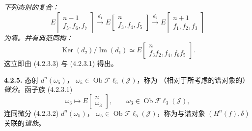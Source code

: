 \clearpage
{}%
\begingroup\small\setlength{\parskip}{0pt}\setlength{\emergencystretch}{2.5em}
\noindent\textit{下列态射的复合：}
\[
E\!\begin{bmatrix}n-1\\ f_5,f_6,f_7\end{bmatrix}
\xrightarrow{d_1}
E\!\begin{bmatrix}n\\ f_3,f_4,f_5\end{bmatrix}
\xrightarrow{d_2}
E\!\begin{bmatrix}n+1\\ f_1,f_2,f_3\end{bmatrix}
\]
\textit{为零。并有典范同构：}
\[
\operatorname{Ker}(d_2)\big/\operatorname{Im}(d_1)
\simeq
E\!\begin{bmatrix}n\\ f_3f_2,f_4,f_6f_5\end{bmatrix}.
\tag{4.2.4.1}
\]
这立即由 (4.2.3.3) 与 (4.2.3.1) 得出。

\medskip\noindent\textbf{4.2.5.}
态射 $d^n(\omega_5)$，
$\omega_5\in\operatorname{Ob}\mathcal{F}\ell_5(\mathcal J)$，称为
（相对于所考虑的谱对象的）\textit{微分}。函子族 (4.2.3.1)
\[
\omega_3\longmapsto
E\!\begin{bmatrix}n\\ \omega_3\end{bmatrix},
\qquad
\omega_3\in\operatorname{Ob}\mathcal{F}\ell_3(\mathcal J),
\]
连同微分 (4.2.3.2) $d^n(\omega_5)$，
$\omega_5\in\operatorname{Ob}\mathcal{F}\ell_5(\mathcal J)$，称为与谱对象
$(H^n(f),\delta)$ 关联的\textit{谱族}。

